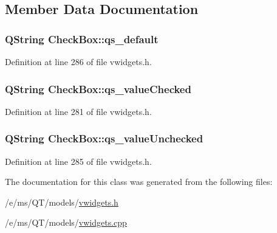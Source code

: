 \subsection{Member Data Documentation}
\hypertarget{classCheckBox_ac21bfd62bb71d0dd23f72e6ef70293d6}{
\subsubsection[{qs\_\-default}]{\setlength{\rightskip}{0pt plus 5cm}QString {\bf CheckBox::qs\_\-default}}}
\label{classCheckBox_ac21bfd62bb71d0dd23f72e6ef70293d6}


Definition at line 286 of file vwidgets.h.

\hypertarget{classCheckBox_a44ec1015259303e99d56c04fe5841e39}{
\subsubsection[{qs\_\-valueChecked}]{\setlength{\rightskip}{0pt plus 5cm}QString {\bf CheckBox::qs\_\-valueChecked}}}
\label{classCheckBox_a44ec1015259303e99d56c04fe5841e39}


Definition at line 281 of file vwidgets.h.

\hypertarget{classCheckBox_aad5473314931f69256aabde7f44c473a}{
\subsubsection[{qs\_\-valueUnchecked}]{\setlength{\rightskip}{0pt plus 5cm}QString {\bf CheckBox::qs\_\-valueUnchecked}}}
\label{classCheckBox_aad5473314931f69256aabde7f44c473a}


Definition at line 285 of file vwidgets.h.



The documentation for this class was generated from the following files:\begin{DoxyCompactItemize}
\item 
/e/ms/QT/models/\hyperlink{vwidgets_8h}{vwidgets.h}\item 
/e/ms/QT/models/\hyperlink{vwidgets_8cpp}{vwidgets.cpp}\end{DoxyCompactItemize}
